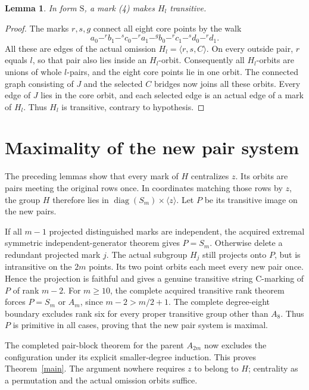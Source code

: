 \documentclass[11pt,a4paper]{article}
\newtheorem{lemma}{Lemma}
\newcommand{\gen}[1]{\langle#1\rangle}
\newcommand{\diag}{\operatorname{diag}}
\begin{document}
\begin{lemma}\label{swapping}
In form $\mathrm S$, a mark (4) makes $H_l$ transitive.
\end{lemma}
\begin{proof}
The marks $r,s,g$ connect all eight core points by the walk
\[
 a_0\mathrel{\mathop{-}^{r}} b_1
 \mathrel{\mathop{-}^{s}}c_0
 \mathrel{\mathop{-}^{r}}a_1
 \mathrel{\mathop{-}^{g}}b_0
 \mathrel{\mathop{-}^{r}}c_1
 \mathrel{\mathop{-}^{s}}d_0
 \mathrel{\mathop{-}^{r}}d_1.
\]
All these are edges of the actual omission $H_l=\gen{r,s,C}$.
On every outside pair, $r$ equals $l$, so that pair also lies
inside an $H_l$-orbit. Consequently all $H_l$-orbits are unions
of whole $l$-pairs, and the eight core points lie in one orbit.
The connected graph consisting of $J$ and the selected $C$
bridges now joins all these orbits. Every edge of $J$ lies in
the core orbit, and each selected edge is an actual edge of a
mark of $H_l$. Thus $H_l$ is transitive, contrary to hypothesis.
\end{proof}

\section*{Maximality of the new pair system}
The preceding lemmas show that every mark of $H$ centralizes $z$.
Its orbits are pairs meeting the original rows once. In coordinates
matching those rows by $z$, the group $H$ therefore lies in
$\diag(S_m)\times\gen z$. Let $P$ be its transitive image
on the new pairs.

If all $m-1$ projected distinguished marks are independent, the
acquired extremal symmetric independent-generator theorem gives
$P=S_m$. Otherwise delete a redundant projected mark $j$.
The actual subgroup $H_j$ still projects onto $P$, but is
intransitive on the $2m$ points. Its two point orbits each meet
every new pair once. Hence the projection is faithful and gives
a genuine transitive string C-marking of $P$ of rank $m-2$.
For $m\ge10$, the complete acquired transitive rank theorem
forces $P=S_m$ or $A_m$, since $m-2>m/2+1$. The complete
degree-eight boundary excludes rank six for every proper
transitive group other than $A_8$. Thus $P$ is primitive in
all cases, proving that the new pair system is maximal.

The completed pair-block theorem for the parent $A_{2m}$ now
excludes the configuration under its explicit smaller-degree
induction. This proves Theorem~\ref{main}. The argument nowhere
requires $z$ to belong to $H$; centrality as a permutation and
the actual omission orbits suffice.
\end{document}
